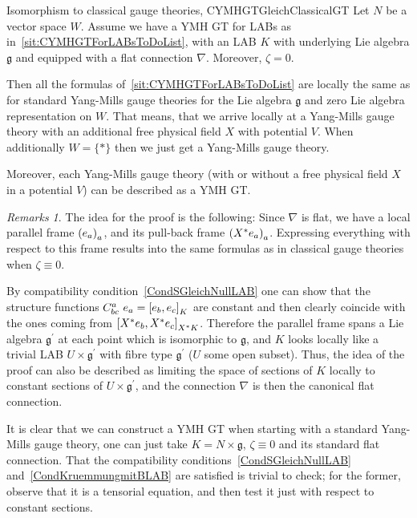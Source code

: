 \documentclass[preprint]{elsarticle}
\theoremstyle{plain}
\theoremstyle{remark}
\newtheorem{remark}[theorem]{Remarks}
\theoremstyle{definition}
\begin{document}
\begin{corollaries}{Isomorphism to classical gauge theories, \cite[here for LABs]{CurvedYMH}}{CYMHGTGleichClassicalGT}
Let $N$ be a vector space $W$. Assume we have a YMH GT for LABs as in~\ref{sit:CYMHGTForLABsToDoList}, with an LAB $K$ with underlying Lie algebra $\mathfrak{g}$ and equipped with a flat connection $\nabla$. Moreover, $\zeta = 0$.

Then all the formulas of~\ref{sit:CYMHGTForLABsToDoList} are locally the same as for standard Yang-Mills gauge theories for the Lie algebra $\mathfrak{g}$ and zero Lie algebra representation on $W$. 
That means, that we arrive locally at a Yang-Mills gauge theory with an additional free physical field $X$ with potential $V$. When additionally $W = \{*\}$ then we just get a Yang-Mills gauge theory.
\newline

Moreover, each Yang-Mills gauge theory (with or without a free physical field $X$ in a potential $V$) can be described as a YMH GT.
\end{corollaries}

\begin{remark}
\leavevmode\newline\label{WePrueftManDenIsomorphismusZuStandardTheorie}
The idea for the proof is the following: Since $\nabla$ is flat, we have a local parallel frame $\mleft( e_a \mright)_a$, and its pull-back frame $\mleft( X^*e_a \mright)_a$. Expressing everything with respect to this frame results into the same formulas as in classical gauge theories when $\zeta \equiv 0$.

By compatibility condition~\eqref{CondSGleichNullLAB} one can show that the structure functions $C^a_{bc} ~ e_a = \mleft[ e_b, e_c \mright]_{K}$ are constant and then clearly coincide with the ones coming from $\mleft[ X^*e_b, X^*e_c \mright]_{X^*K}$. Therefore the parallel frame spans a Lie algebra $\mathfrak{g}^\prime$ at each point which is isomorphic to $\mathfrak{g}$, and $K$ looks locally like a trivial LAB $U \times \mathfrak{g}^\prime$ with fibre type $\mathfrak{g}^\prime$ ($U$ some open subset). Thus, the idea of the proof can also be described as limiting the space of sections of $K$ locally to constant sections of $U \times \mathfrak{g}^\prime$, and the connection $\nabla$ is then the canonical flat connection.

It is clear that we can construct a YMH GT when starting with a standard Yang-Mills gauge theory, one can just take $K= N \times \mathfrak{g}$, $\zeta \equiv 0$ and its standard flat connection. That the compatibility conditions~\eqref{CondSGleichNullLAB} and~\eqref{CondKruemmungmitBLAB} are satisfied is trivial to check; for the former, observe that it is a tensorial equation, and then test it just with respect to constant sections.
\end{remark}
\end{document}
